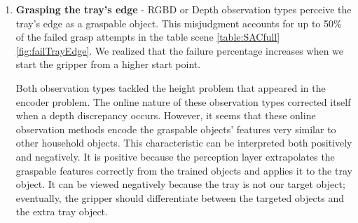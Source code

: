 \begin{enumerate}
    \item \textbf{Grasping the tray's edge} - RGBD or Depth observation types perceive the tray's edge as a graspable object. This misjudgment accounts for up to 50\% of the failed grasp attempts in the table scene \ref{table:SACfull} \ref{fig:failTrayEdge}. We realized that the failure percentage increases when we start the gripper from a higher start point.

    Both observation types tackled the height problem that appeared in the encoder problem. The online nature of these observation types corrected itself when a depth discrepancy occurs. However, it seems that these online observation methods encode the graspable objects' features very similar to other household objects. This characteristic can be interpreted both positively and negatively. It is positive because the perception layer extrapolates the graspable features correctly from the trained objects and applies it to the tray object. It can be viewed negatively because the tray is not our target object; eventually, the gripper should differentiate between the targeted objects and the extra tray object.   
    

\end{enumerate}
